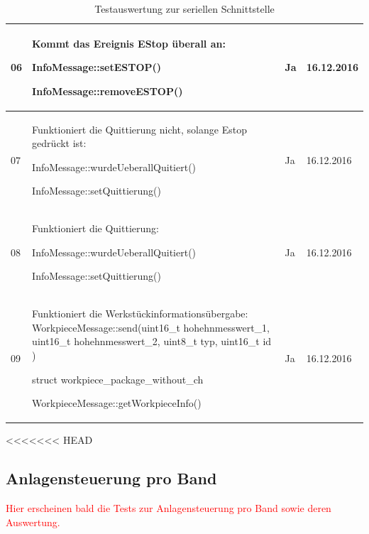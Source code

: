 \documentclass[a4paper, 11pt]{article}
\begin{document}
\begin{table}[H]
\begin{tabularx}{\textwidth}{|l|X|l|l|}
        06&Kommt das Ereignis EStop überall an:
        \begin{compactenum}[]
            \item \ttfamily InfoMessage::setESTOP()
            \item \ttfamily InfoMessage::removeESTOP()
        \end{compactenum}
        &Ja&16.12.2016\\
        \hline
        
        07&Funktioniert die Quittierung nicht, solange Estop gedrückt ist:
        \begin{compactenum}[]
            \item \ttfamily InfoMessage::wurdeUeberallQuitiert()
            \item \ttfamily InfoMessage::setQuittierung()
        \end{compactenum}
        &Ja&16.12.2016\\
        \hline
        
        08&Funktioniert die Quittierung:
        \begin{compactenum}[]
            \item \ttfamily InfoMessage::wurdeUeberallQuitiert()
            \item \ttfamily InfoMessage::setQuittierung()
        \end{compactenum}
        &Ja&16.12.2016\\
        \hline
        
        09&Funktioniert die Werkstückinformationsübergabe:
        {\ttfamily WorkpieceMessage::send(uint16\_t hohehnmesswert\_1, uint16\_t hohehnmesswert\_2, uint8\_t typ, uint16\_t id )}
        \begin{compactenum}[]
            \item \ttfamily struct workpiece\_package\_without\_ch 
            \item \ttfamily WorkpieceMessage::getWorkpieceInfo()
        \end{compactenum}
        &Ja&16.12.2016\\
        \hline
    \end{tabularx}
    \caption{Testauswertung zur seriellen Schnittstelle}
    \label{tstserintf}
\end{table}

\newpage

<<<<<<< HEAD
\subsection{Anlagensteuerung pro Band}
\textcolor{red}{Hier erscheinen bald die Tests zur Anlagensteuerung pro Band sowie deren Auswertung.}
\end{document}
